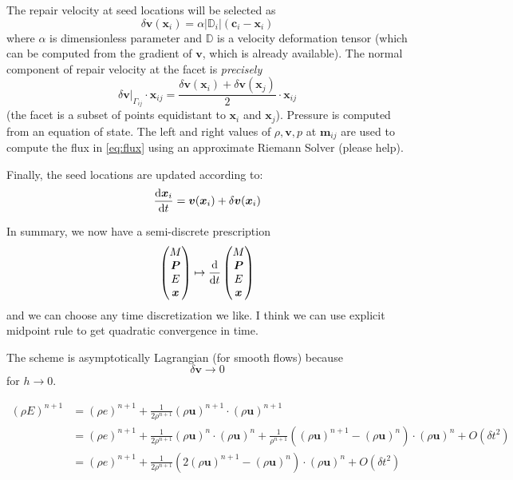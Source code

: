 \documentclass{article}
\newcommand{\vv}{\bm{v}}
\newcommand{\xx}{\bm{x}}
\begin{document}
The repair velocity at seed locations will be selected as
\begin{equation}
	\delta \vv(\xx_i) = \alpha |\mathbb{D}_i| (\bm{c}_i - \xx_i)
\end{equation}
where $\alpha$ is dimensionless parameter and $\mathbb{D}$ is a velocity deformation tensor (which can be computed from the gradient of $\vv$, which is already available). The normal component of repair velocity at the facet is \textit{precisely}
\begin{equation}
	\delta \vv|_{\Gamma_{ij}} \cdot \xx_{ij} = \frac{\delta \vv(\xx_i) + \delta \vv(\xx_j)}{2} \cdot \xx_{ij}
\end{equation}
(the facet is a subset of points equidistant to $\xx_i$ and $\xx_j$).
Pressure is computed from an equation of state. The left and right values of $\rho, \vv, p$ at $\bm{m}_{ij}$ are used to compute the flux in \eqref{eq:flux} using an approximate Riemann Solver {\color{red}(please help)}. 

Finally, the seed locations are updated according to:
\begin{equation}
	\dv{\xx_i}{t} = \vv(\xx_i) + \delta \vv(\xx_i)
\end{equation}

In summary, we now have a semi-discrete prescription 
\begin{equation}
	\begin{pmatrix}
		M \\
		\bm{P} \\
		E \\
		\xx 
	\end{pmatrix}
	\mapsto 
	\dv{}{t}\begin{pmatrix}
		M \\
		\bm{P} \\
		E \\
		\xx 
	\end{pmatrix}
\end{equation}
and we can choose any time discretization we like. I think we can use explicit midpoint rule to get quadratic convergence in time.

The scheme is asymptotically Lagrangian (for smooth flows) because
\begin{equation}
	\delta \vv \to 0
\end{equation}
for $h \to 0$.

\begin{equation}
	\begin{split}
		(\rho E)^{n+1} &= (\rho e)^{n+1} + \frac{1}{2\rho^{n+1}}( \rho\bm{u})^{n+1} \cdot (\rho \bm{u})^{n+1} \\
		&= (\rho e)^{n+1} + \frac{1}{2\rho^{n+1}}(\rho\bm{u})^{n} \cdot (\rho\bm{u})^{n} + \frac{1}{\rho^{n+1}}((\rho\bm{u})^{n+1} - (\rho\bm{u})^{n}) \cdot (\rho\bm{u})^{n} + O(\delta t^2)\\
		&= (\rho e)^{n+1} + \frac{1}{2\rho^{n+1}}(2(\rho\bm{u})^{n+1} - (\rho \bm{u})^{n}) \cdot (\rho\bm{u})^{n} + O(\delta t^2)
	\end{split}
\end{equation}
\end{document}
